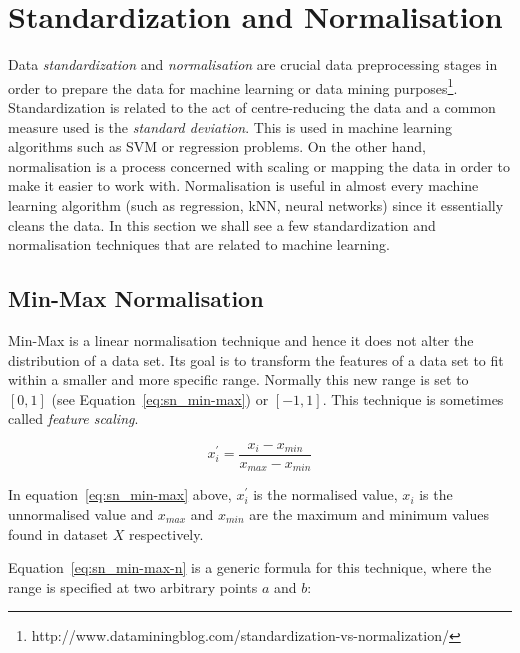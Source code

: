 \chapter{Standardization and Normalisation}

\label{ch:standardization-and-normalization}

Data \emph{standardization} and \emph{normalisation} are crucial data preprocessing stages in order to prepare the data for machine learning or data mining purposes\footnote{http://www.dataminingblog.com/standardization-vs-normalization/}.  Standardization is related to the act of centre-reducing the data and a common measure used is the \emph{standard deviation}.  This is used in machine learning algorithms such as SVM  or regression  problems.  On the other hand, normalisation is a process concerned with scaling or mapping the data in order to make it easier to work with\citep{patro2015normalization}.  Normalisation is useful in almost every machine learning algorithm (such as regression, kNN, neural networks) since it essentially cleans the data.  In this section we shall see a few standardization and normalisation techniques that are related to machine learning.



\section{Min-Max Normalisation}
Min-Max is a linear normalisation technique and hence it does not alter the distribution of a data set.  Its goal is to transform the features of a data set to fit within a smaller and more specific range.  Normally this new range is set to $[0,1]$ (see Equation~\ref{eq:sn_min-max}) or $[-1,1]$.  This technique is sometimes called \emph{feature scaling}.

\begin{equation}
\label{eq:sn_min-max}
x^{\prime}_{i} = \frac{x_{i} - x_{min}}{x_{max} - x_{min}}
\end{equation}

In equation~\ref{eq:sn_min-max} above, $x^{\prime}_i$ is the normalised value, $x_{i}$ is the unnormalised value and $x_{max}$ and $x_{min}$ are the maximum and minimum values found in dataset $X$ respectively.  

Equation~\ref{eq:sn_min-max-n} is a generic formula for this technique, where the range is specified at two arbitrary points $a$ and $b$:

